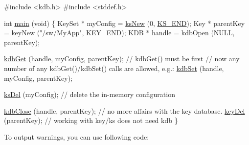 \begin{DoxyCodeInclude}

\textcolor{preprocessor}{#include <kdb.h>}
\textcolor{preprocessor}{#include <stddef.h>}

\textcolor{keywordtype}{int} \hyperlink{testio__doc_8c_a3c04138a5bfe5d72780bb7e82a18e627}{main} (\textcolor{keywordtype}{void})
\{
        KeySet * myConfig = \hyperlink{group__keyset_ga671e1aaee3ae9dc13b4834a4ddbd2c3c}{ksNew} (0, \hyperlink{group__keyset_ga7a28fce3773b2c873c94ac80b8b4cd54}{KS\_END});
        Key * parentKey = \hyperlink{group__key_gad23c65b44bf48d773759e1f9a4d43b89}{keyNew} (\textcolor{stringliteral}{"/sw/MyApp"}, \hyperlink{group__key_gga9b703ca49f48b482def322b77d3e6bc8aa8adb6fcb92dec58fb19410eacfdd403}{KEY\_END});
        KDB * handle = \hyperlink{group__kdb_ga844e1299a84c3fbf1d3a905c5c893ba5}{kdbOpen} (NULL, parentKey);

        \hyperlink{group__kdb_ga28e385fd9cb7ccfe0b2f1ed2f62453a1}{kdbGet} (handle, myConfig, parentKey); \textcolor{comment}{// kdbGet() must be first}
        \textcolor{comment}{// now any number of any kdbGet()/kdbSet() calls are allowed, e.g.:}
        \hyperlink{group__kdb_ga11436b058408f83d303ca5e996832bcf}{kdbSet} (handle, myConfig, parentKey);

        \hyperlink{group__keyset_ga27e5c16473b02a422238c8d970db7ac8}{ksDel} (myConfig); \textcolor{comment}{// delete the in-memory configuration}

        \hyperlink{group__kdb_gadb54dc9fda17ee07deb9444df745c96f}{kdbClose} (handle, parentKey); \textcolor{comment}{// no more affairs with the key database.}
        \hyperlink{group__key_ga3df95bbc2494e3e6703ece5639be5bb1}{keyDel} (parentKey);             \textcolor{comment}{// working with key/ks does not need kdb}
\}
\end{DoxyCodeInclude}


To output warnings, you can use following code\+:


